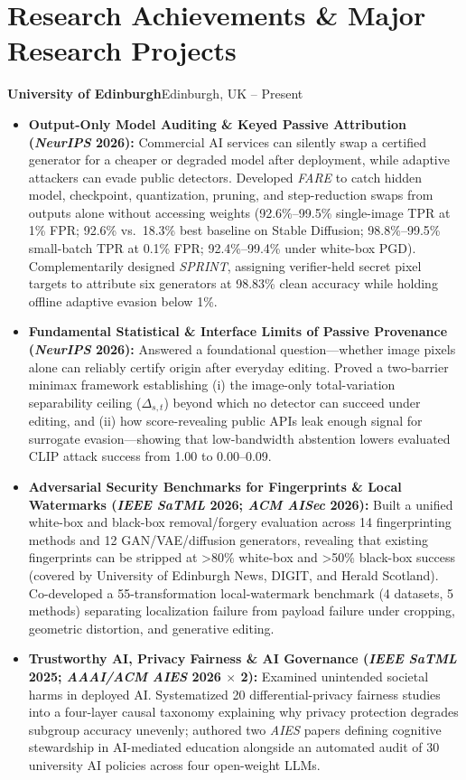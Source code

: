 \documentclass[10pt,a4paper]{article}
\newcommand{\role}[4]{%
  \Needspace{4\baselineskip}%
  \vspace{2.4pt}%
  {\headingfont\bfseries\color{navy}#1}\enspace{\color{rulegray}\textbar}\enspace{\color{ink}\textit{#2}}\hfill{\fontsize{8.45}{10.0}\selectfont\color{muted}#3 \enspace\textbullet\enspace #4}\par
}
\begin{document}
\section*{Research Achievements \& Major Research Projects}

\role{University of Edinburgh}{PhD Researcher, School of Informatics}{Edinburgh, UK}{2023 -- Present}
\begin{itemize}[itemsep=1.7pt]
  \item \textbf{Output-Only Model Auditing \& Keyed Passive Attribution (\textit{NeurIPS} 2026):} Commercial AI services can silently swap a certified generator for a cheaper or degraded model after deployment, while adaptive attackers can evade public detectors. Developed \textit{FARE} to catch hidden model, checkpoint, quantization, pruning, and step-reduction swaps from outputs alone without accessing weights (92.6\%--99.5\% single-image TPR at 1\% FPR; 92.6\% vs.\ 18.3\% best baseline on Stable Diffusion; 98.8\%--99.5\% small-batch TPR at 0.1\% FPR; 92.4\%--99.4\% under white-box PGD). Complementarily designed \textit{SPRINT}, assigning verifier-held secret pixel targets to attribute six generators at 98.83\% clean accuracy while holding offline adaptive evasion below 1\%.
  \item \textbf{Fundamental Statistical \& Interface Limits of Passive Provenance (\textit{NeurIPS} 2026):} Answered a foundational question—whether image pixels alone can reliably certify origin after everyday editing. Proved a two-barrier minimax framework establishing (i) the image-only total-variation separability ceiling ($\Delta_{s,t}$) beyond which no detector can succeed under editing, and (ii) how score-revealing public APIs leak enough signal for surrogate evasion—showing that low-bandwidth abstention lowers evaluated CLIP attack success from 1.00 to 0.00--0.09.
  \item \textbf{Adversarial Security Benchmarks for Fingerprints \& Local Watermarks (\textit{IEEE SaTML} 2026; \textit{ACM AISec} 2026):} Built a unified white-box and black-box removal/forgery evaluation across 14 fingerprinting methods and 12 GAN/VAE/diffusion generators, revealing that existing fingerprints can be stripped at >80\% white-box and >50\% black-box success (covered by University of Edinburgh News, DIGIT, and Herald Scotland). Co-developed a 55-transformation local-watermark benchmark (4 datasets, 5 methods) separating localization failure from payload failure under cropping, geometric distortion, and generative editing.
  \item \textbf{Trustworthy AI, Privacy Fairness \& AI Governance (\textit{IEEE SaTML} 2025; \textit{AAAI/ACM AIES} 2026 $\times$ 2):} Examined unintended societal harms in deployed AI. Systematized 20 differential-privacy fairness studies into a four-layer causal taxonomy explaining why privacy protection degrades subgroup accuracy unevenly; authored two \textit{AIES} papers defining cognitive stewardship in AI-mediated education alongside an automated audit of 30 university AI policies across four open-weight LLMs.
\end{itemize}
\end{document}
